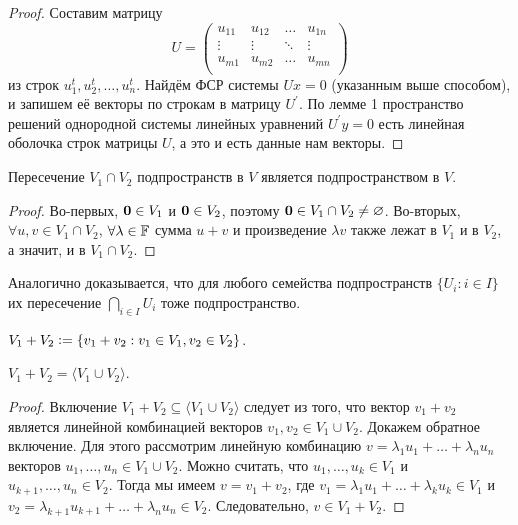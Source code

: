 \begin{proof}
    Составим матрицу
    \[
        U = 
        \begin{pmatrix}
            u_{11} & u_{12} & \ldots & u_{1n}\\
            \vdots & \vdots & \ddots & \vdots\\
            u_{m1} & u_{m2} & \ldots & u_{mn}\\
        \end{pmatrix}
    \]
    из строк $u_1^t, u_2^t, \ldots, u_n^t$. Найдём ФСР системы $Ux = 0$ (указанным выше способом), и запишем её векторы по строкам в матрицу $U^\prime$. По лемме 1 пространство решений однородной системы линейных уравнений $U^\prime y = 0$ есть линейная оболочка строк матрицы $U$, а это и есть данные нам векторы.
\end{proof}

\begin{proposal}
    Пересечение $V_1 \cap V_2$ подпространств в $V$ является подпространством в $V$.
\end{proposal}

\begin{proof}
    Во-первых, $\boldsymbol{0} \in V_1$ и $\boldsymbol{0} \in V_2$, поэтому $\boldsymbol{0} \in V_1 \cap V_2 \ne \varnothing$. Во-вторых, $\forall u, v \in V_1 \cap V_2$, $\forall \lambda \in \mathbb{F}$ сумма $u + v$ и произведение $\lambda v$ также лежат в $V_1$ и в $V_2$, а значит, и в $V_1 \cap V_2$.
\end{proof}

\begin{remark}
    Аналогично доказывается, что для любого семейства подпространств $\{U_i : i \in I\}$ их пересечение $\bigcap\limits_{i \in I}U_i$ тоже подпространство.
\end{remark}

\begin{definition}
    $V_1 + V_2 \vcentcolon = \{v_1 + v_2 : v_1 \in V_1, v_2 \in V_2\}$.
\end{definition}

\begin{proposal}
    $V_1 + V_2 = \langle V_1 \cup V_2\rangle$.
\end{proposal}

\begin{proof}
    Включение $V_1 + V_2 \subseteq \langle V_1 \cup V_2\rangle$ следует из того, что вектор $v_1 + v_2$ является линейной комбинацией векторов $v_1, v_2 \in V_1 \cup V_2$. Докажем обратное включение. Для этого рассмотрим линейную комбинацию $v = \lambda_1u_1 + \ldots + \lambda_nu_n$ векторов $u_1, \ldots, u_n \in V_1 \cup V_2$. Можно считать, что $u_1, \ldots, u_k \in V_1$ и $u_{k + 1}, \ldots, u_n \in V_2$. Тогда мы имеем $v = v_1 + v_2$, где $v_1 = \lambda_1u_1 + \ldots + \lambda_ku_k \in V_1$ и $v_2 = \lambda_{k + 1}u_{k + 1} + \ldots + \lambda_nu_n \in V_2$. Следовательно, $v \in V_1 + V_2$.
\end{proof}

